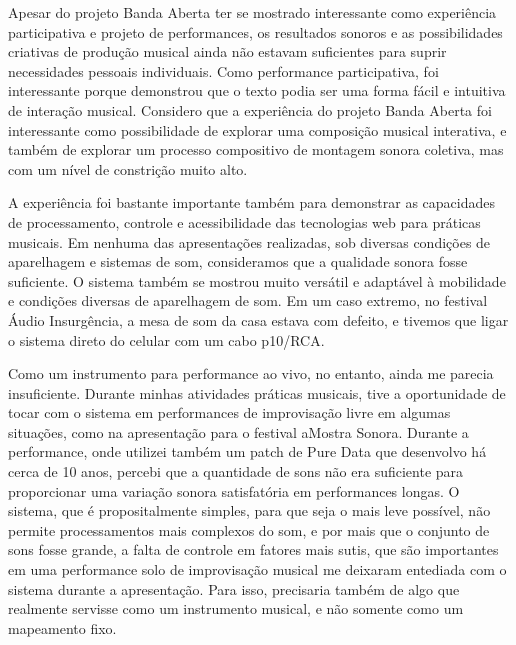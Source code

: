 
Apesar do projeto Banda Aberta ter se mostrado interessante como experiência participativa e projeto de performances, os resultados sonoros e as possibilidades criativas de produção musical ainda não estavam suficientes para suprir necessidades pessoais individuais. Como performance participativa, foi interessante porque demonstrou que o texto podia ser uma forma fácil e intuitiva de interação musical. Considero que a experiência do projeto Banda Aberta foi interessante como possibilidade de explorar uma composição musical interativa, e também de explorar um processo compositivo de montagem sonora coletiva, mas com um nível de constrição muito alto. 

A experiência foi bastante importante também para demonstrar as capacidades de processamento, controle e acessibilidade das tecnologias web para práticas musicais. Em nenhuma das apresentações realizadas, sob diversas condições de aparelhagem e sistemas de som, consideramos que a qualidade sonora fosse suficiente. O sistema também se mostrou muito versátil e adaptável à mobilidade e condições diversas de aparelhagem de som. Em um caso extremo, no festival Áudio Insurgência, a mesa de som da casa estava com defeito, e tivemos que ligar o sistema direto do celular com um cabo p10/RCA.

Como um instrumento para performance ao vivo, no entanto, ainda me parecia insuficiente. Durante minhas atividades práticas musicais, tive a oportunidade de tocar com o sistema em performances de improvisação livre em algumas situações, como na apresentação para o festival aMostra Sonora. Durante a performance, onde utilizei também um patch de Pure Data que desenvolvo há cerca de 10 anos, percebi que a quantidade de sons não era suficiente para proporcionar uma variação sonora satisfatória em performances longas. O sistema, que é propositalmente simples, para que seja o mais leve possível, não permite processamentos mais complexos do som, e por mais que o conjunto de sons fosse grande, a falta de controle em fatores mais sutis, que são importantes em uma performance solo de improvisação musical me deixaram entediada com o sistema durante a apresentação. Para isso, precisaria também de algo que realmente servisse como um instrumento musical, e não somente como um mapeamento fixo. 

